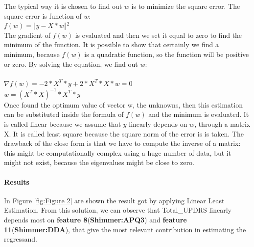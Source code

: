\documentclass[12pt,a4paper,oneside]{article}
\begin{document}
	The typical way it is chosen to find out $w$ is to minimize the square error. The square error is function of $w$:\\
	$f(w)=$‖$y-X*w$‖$^{2}$\\
	The gradient of $f(w)$ is evaluated and then we set it equal to zero to find the minimum of the function. It is possible to show that certainly we find a minimum, because $f(w)$ is a quadratic function, so the function will be positive or zero. By solving the equation, we find out $w$:\\\\
	$\nabla f(w)=-2*X^{T}*y+2*X^{T}*X*w=0 $\\
	$w=(X^{T}*X)^{-1}*X^{T}*y$\\
	
	Once found the optimum value of vector w, the unknowns, then this estimation can be substituted inside the formula of $f(w)$ and the minimum is evaluated. It is called linear because we assume that $y$ linearly depends on $w$, through a matrix X. It is called least square because the square norm of the error is is taken. The drawback of the close form is that we have to compute the inverse of a matrix: this might be computationally complex using a huge number of data, but it might not exist, because the eigenvalues might be close to zero.
	\paragraph{Results} In Figure \ref{fig:Figure 2} are shown the result got by applying Linear Least Estimation. From this solution, we can observe that Total\_UPDRS linearly depends most on \textbf{feature 8}(\textbf{Shimmer:APQ3}) and \textbf{feature 11}(\textbf{Shimmer:DDA}), that give the most relevant contribution in estimating the regressand.
	
\end{document}
